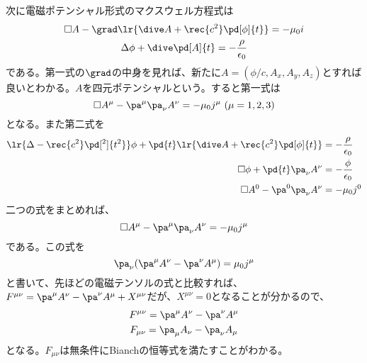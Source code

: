             次に電磁ポテンシャル形式のマクスウェル方程式は
            \begin{gather*}
                \square A-\grad
                \lr{\dive A+\rec{c^2}\pd[\phi]{t}} = -\mu_0i\\
                \Delta\phi + \dive\pd[A]{t} = -\frac{\rho}{\epsilon_0}\\
            \end{gather*}
            である。第一式の$\grad$の中身を見れば、新たに$A=(\phi/c,A_x,A_y,A_z)$とすれば良いとわかる。$A$を四元ポテンシャルという。すると第一式は
                \[\square A^\mu-\pa^\mu\pa_\nu A^\nu
                = -\mu_0j^\mu\ (\mu = 1,2,3)\]
            となる。また第二式を
            \begin{align*}
                \lr{\Delta-\rec{c^2}\pd[^2]{t^2}}\phi
                +\pd{t}\lr{\dive A+\rec{c^2}\pd[\phi]{t}}
                &= -\frac{\rho}{\epsilon_0}\\
                \square \phi + \pd{t}\pa_\nu A^\nu
                &= -\frac{\phi}{\epsilon_0}\\
                \square A^0 - \pa^0\pa_\nu A^\nu &= -\mu_0j^0
            \end{align*}
            二つの式をまとめれば、
                \[\square A^\mu-\pa^\mu\pa_\nu A^\nu = -\mu_0j^\mu\]
            である。この式を
                \[\pa_\nu(\pa^\mu A^\nu-\pa^\nu A^\mu) = \mu_0j^\mu\]
            と書いて、先ほどの電磁テンソルの式と比較すれば、$F^{\mu\nu} = \pa^\mu A^\nu-\pa^\nu A^\mu+X^{\mu\nu}$だが、$X^{\mu\nu}=0$となることが分かるので、
            \begin{gather*}
                F^{\mu\nu} = \pa^\mu A^\nu-\pa^\nu A^\mu\\
                F_{\mu\nu} = \pa_\mu A_\nu-\pa_\nu A_\mu
            \end{gather*}
            となる。$F_{\mu\nu}$は無条件にBianchの恒等式を満たすことがわかる。\\

